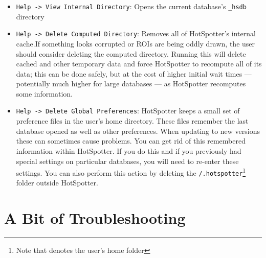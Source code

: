 \documentclass[a4paper,10pt]{article}
\begin{document}
\begin{itemize}
\item \verb+Help -> View Internal Directory+: 
    Opens the current database's {\tt \_hsdb} directory

\item \verb+Help -> Delete Computed Directory+: 
    Removes all of HotSpotter's internal cache.If something looks corrupted or ROIs are being oddly drawn, the user
        should consider deleting the computed directory.  Running  this will delete cached and 
	other temporary data and force HotSpotter to recompute all of its data; this can be done safely, but at the cost of 
	higher initial wait times --- potentially much higher for large databases --- as HotSpotter recomputes some information. 

\item \verb+Help -> Delete Global Preferences+: 
    HotSpotter keeps a small set of preference files in the user's  home directory.
        These files remember the last database opened as well as other
        preferences. When updating to new versions these can sometimes cause
        problems.  You can get rid of this remembered information within HotSpotter.   If you do this and if you previously had special settings on particular databases, you will need to re-enter these settings.  You can also   
       perform this action by deleting the {\tt \texttildelow/.hotspotter}\footnote{Note
            that {\tt \texttildelow} denotes the user's home folder} folder outside HotSpotter.
     



\end{itemize}
  
\newpage

\section{A Bit of Troubleshooting}
\end{document}
